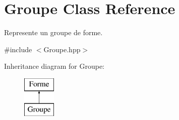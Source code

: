 \hypertarget{class_groupe}{}\section{Groupe Class Reference}
\label{class_groupe}


Represente un groupe de forme.  




{\ttfamily \#include $<$Groupe.\+hpp$>$}

Inheritance diagram for Groupe\+:\begin{figure}[H]
\begin{center}
\leavevmode
\includegraphics[height=2.000000cm]{class_groupe}
\end{center}
\end{figure}
